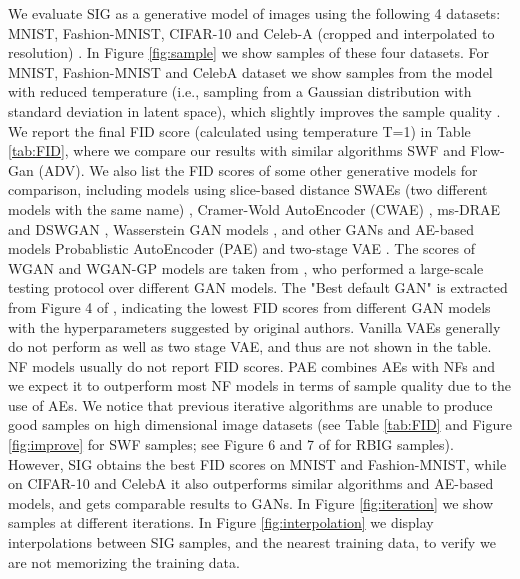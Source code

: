 \documentclass{article}
\begin{document}
We evaluate SIG as a generative model of images using the following 4 datasets: MNIST, Fashion-MNIST, CIFAR-10 \citep{krizhevsky2009learning} and Celeb-A (cropped and interpolated to  resolution) \citep{liu2015faceattributes}.
In Figure \ref{fig:sample} we show samples of these four datasets. For MNIST, Fashion-MNIST and CelebA dataset we show samples from the model with reduced temperature  (i.e., sampling from a Gaussian distribution with standard deviation  in latent space), which slightly improves the sample quality \citep{parmar2018image, kingma2018glow}. We report the final FID score (calculated using temperature T=1) in Table \ref{tab:FID}, where we compare our results with similar algorithms SWF and Flow-Gan (ADV). We also list the FID scores of some other generative models for comparison, including models using slice-based distance SWAEs (two different models with the same name) \citep{wu2019sliced, kolouri2018sliced}, Cramer-Wold AutoEncoder (CWAE) \citep{knop2018cramer}, ms-DRAE \citep{nguyen2020improving} and DSWGAN \citep{nguyen2020distributional}, Wasserstein GAN models \citep{arjovsky2017wasserstein, gulrajani2017improved}, and other GANs and AE-based models Probablistic AutoEncoder (PAE) \citep{bohm2020probabilistic} and two-stage VAE \citep{dai2019diagnosing,xiao2019generative}.
The scores of WGAN and WGAN-GP models are taken from \citet{lucic2018gans}, who performed a large-scale testing protocol over different GAN models. The "Best default GAN" is extracted from Figure 4 of \citet{lucic2018gans}, indicating the lowest FID scores from different GAN models with the hyperparameters suggested by original authors. 
Vanilla VAEs generally do not perform as well as two stage VAE, and thus are not shown in the table.
NF models usually do not report FID scores. PAE combines AEs with NFs and we expect it to outperform most NF models in terms of sample quality due to the use of AEs. We notice that previous iterative algorithms are unable to produce good samples on high dimensional image datasets (see Table \ref{tab:FID} and Figure \ref{fig:improve} for SWF samples; see Figure 6 and 7 of \citet{meng2020gaussianization} for RBIG samples). However, SIG obtains the best FID scores on MNIST and Fashion-MNIST, while on CIFAR-10 and CelebA it also outperforms similar algorithms and AE-based models, and gets comparable results to GANs.
In Figure \ref{fig:iteration} we show samples at different iterations. 
In Figure \ref{fig:interpolation} we display interpolations between SIG samples, and the nearest training data, to verify we are not memorizing the training data.
\end{document}
